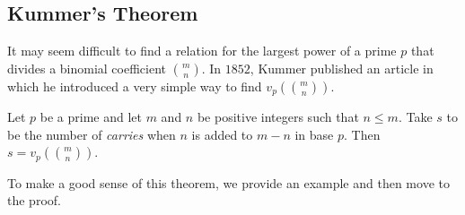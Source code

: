 \documentclass[12pt]{subfile}
\begin{document}
\subsection{Kummer's Theorem}
It may seem difficult to find a relation for the largest power of a prime $p$ that divides a binomial coefficient $\binom{m}{n}$. In $1852$, Kummer published an article in which he introduced a very simple way to find $v_p\left(\binom{m}{n}\right)$. 

\begin{theorem}
	Let $p$ be a prime and let $m$ and $n$ be positive integers such that $n \leq m$. Take $s$ to be the number of \textit{carries} when $n$ is added to $m-n$ in base $p$. Then $s = v_p\left( \binom{m}{n}\right)$.
\end{theorem}

To make a good sense of this theorem, we provide an example and then move to the proof.
\end{document}

